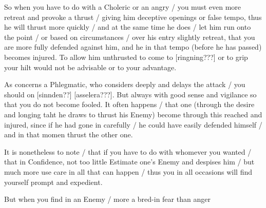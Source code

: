 
So when you have to do with a Choleric or an angry / you must even
more retreat and provoke a thrust / giving him deceptive openings or
false tempo, thus he will thrust more quickly / and at the same time
he does / let him run onto the point / or based on circumstances /
over his entry slightly retreat, that you are more fully defended
against him, and he in that tempo (before he has passed) becomes
injured. To allow him unthrusted to come to
[ringning???] or to grip
your hilt would not be advisable or to your advantage.


As concerns a Phlegmatic, who considers deeply and delays the attack /
you should on [sinnden??] [asselera???]. But always with good sense and
vigilance so that you do not become fooled. It often happens / that
one (through the desire and longing taht he draws to thrust his Enemy)
become through this reached and injured, since if he had gone in
carefully / he could have easily defended himself / and in that momen
thrust the other one.


It is nonetheless to note / that if you have to do with whomever you
wanted / that in Confidence, not too little Estimate one's Enemy and
despises him / but much more use care in all that can happen / thus
you in all occasions will find yourself prompt and expedient.


But when you find in an Enemy / more a bred-in fear than anger